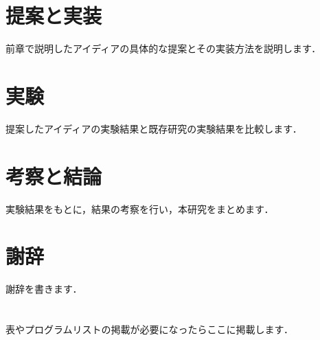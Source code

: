 \documentclass{suribt}
\begin{document}
\chapter{提案と実装}
前章で説明したアイディアの具体的な提案とその実装方法を説明します．

\chapter{実験}
提案したアイディアの実験結果と既存研究の実験結果を比較します．

\chapter{考察と結論}
実験結果をもとに，結果の考察を行い，本研究をまとめます．

\backmatter
\chapter{謝辞}
謝辞を書きます．

\begin{thebibliography}{}
 \bibitem{}
 \bibitem{}
\end{thebibliography}

\appendix
\chapter{}
表やプログラムリストの掲載が必要になったらここに掲載します．
\end{document}
